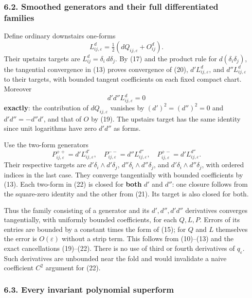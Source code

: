 \documentclass[
  11pt,
]{article}
\begin{document}
\subsubsection{6.2. Smoothed generators and their full differentiated
families}\label{smoothed-generators-and-their-full-differentiated-families}

Define ordinary downstairs one-forms \[
 L_{ij,\varepsilon}^{d}
      =\tfrac12(dQ_{ij,\varepsilon}+O_{ij}^{d}).             \tag{20}
\] Their upstairs targets are \(L_{ij}^{d}=\delta_i\,d\delta_j\). By
(17) and the product rule for \(d(\delta_i\delta_j)\), the tangential
convergence in (13) proves convergence of (20),
\(d'L_{ij,\varepsilon}^{d}\), and \(d''L_{ij,\varepsilon}^{d}\) to their
targets, with bounded tangent coefficients on each fixed compact chart.
Moreover \[
 d'd''L_{ij,\varepsilon}^{d}=0                              \tag{21}
\] \textbf{exactly}: the contribution of \(dQ_{ij,\varepsilon}\)
vanishes by \((d')^2=(d'')^2=0\) and \(d'd''=-d''d'\), and that of \(O\)
by (19). The upstairs target has the same identity since unit logarithms
have zero \(d'd''\) as forms.

Use the two-form generators \[
 P_{ij,\varepsilon}^{++}=d'L_{ij,\varepsilon}^{d'},\quad
 P_{ij,\varepsilon}^{--}=d''L_{ij,\varepsilon}^{d''},\quad
 P_{ij,\varepsilon}^{+-}=d'L_{ij,\varepsilon}^{d''}.          \tag{22}
\] Their respective targets are \(d'\delta_i\wedge d'\delta_j\),
\(d''\delta_i\wedge d''\delta_j\), and \(d'\delta_i\wedge d''\delta_j\),
with ordered indices in the last case. They converge tangentially with
bounded coefficients by (13). Each two-form in (22) is closed for
\textbf{both} \(d'\) and \(d''\): one closure follows from the
square-zero identity and the other from (21). Its target is also closed
for both.

Thus the family consisting of a generator and its \(d',d'',d'd''\)
derivatives converges tangentially, with uniformly bounded coefficients,
for each \(Q,L,P\). Errors of its entries are bounded by a constant
times the form of (15); for \(Q\) and \(L\) themselves the error is
\(O(\varepsilon)\) without a strip term. This follows from (10)--(13)
and the exact cancellations (19)--(22). There is no use of third or
fourth derivatives of \(q_\varepsilon\). Such derivatives are unbounded
near the fold and would invalidate a naive coefficient \(C^2\) argument
for (22).

\subsubsection{6.3. Every invariant polynomial
superform}\label{every-invariant-polynomial-superform}
\end{document}
